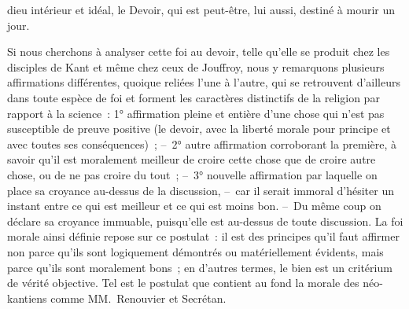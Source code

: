 \documentclass[french,twoside]{book} %
\begin{document}
dieu intérieur et idéal, le Devoir, qui est peut-être, lui aussi, destiné à mourir un jour.\par
Si nous cherchons à analyser cette foi au devoir, telle qu’elle se produit chez les disciples de Kant et même chez ceux de Jouffroy, nous y remarquons plusieurs affirmations différentes, quoique reliées l’une à l’autre, qui se retrouvent d’ailleurs dans toute espèce de foi et forment les caractères distinctifs de la religion par rapport à la science : 1° affirmation pleine et entière d’une chose qui n’est pas susceptible de preuve positive (le devoir, avec la liberté morale pour principe et avec toutes ses conséquences) ; – 2° autre affirmation corroborant la première, à savoir qu’il est moralement meilleur de croire cette chose que de croire autre chose, ou de ne pas croire du tout ; – 3° nouvelle affirmation par laquelle on place sa croyance au-dessus de la discussion, – car il serait immoral d’hésiter un instant entre ce qui est meilleur et ce qui est moins bon. – Du même coup on déclare sa croyance immuable, puisqu’elle est au-dessus de toute discussion. La foi morale ainsi définie repose sur ce postulat : il est des principes qu’il faut affirmer non parce qu’ils sont logiquement démontrés ou matériellement évidents, mais parce qu’ils sont moralement bons ; en d’autres termes, le bien est un critérium de vérité objective. Tel est le postulat que contient au fond la morale des néo-kantiens comme MM. Renouvier et Secrétan.\par
\end{document}
